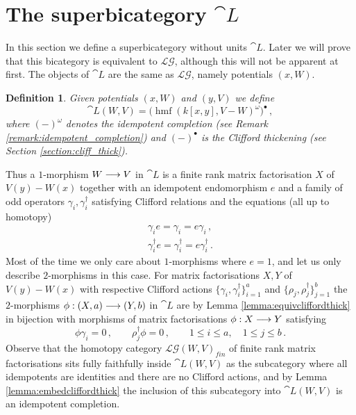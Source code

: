 \documentclass[english,letter paper,12pt,leqno]{article}
\theoremstyle{example}
\newtheorem{definition}[theorem]{Definition}
\numberwithin{equation}{section}
\def\LG{\mathcal{LG}}
\def\be{\begin{equation}}
\def\ee{\end{equation}}
\DeclareMathOperator{\hmf}{hmf}
\begin{document}
\section{The superbicategory $\cat{L}$}\label{section:lg_cut_system}


In this section we define a superbicategory without units $\cat{L}$. Later we will prove that this bicategory is equivalent to $\LG$, although this will not be apparent at first. The objects of $\cat{L}$ are the same as $\LG$, namely potentials $(x,W)$.

\begin{definition} Given potentials $(x,W)$ and $(y,V)$ we define
\be\label{eq:defnluv}
\cat{L}(W,V) = \Big( \hmf( k[x,y], V - W )^{\omega} \Big)^{\bullet}\,,
\ee
where $(-)^\omega$ denotes the idempotent completion (see Remark \ref{remark:idempotent_completion}) and $(-)^{\bullet}$ is the Clifford thickening (see Section \ref{section:cliff_thick}).
\end{definition}

Thus a $1$-morphism $W \longrightarrow V$ in $\cat{L}$ is a finite rank matrix factorisation $X$ of $V(y) - W(x)$ together with an idempotent endomorphism $e$ and a family of odd operators $\gamma_i, \gamma_i^\dagger$ satisfying Clifford relations and the equations (all up to homotopy)
\begin{gather*}
\gamma_i e = \gamma_i = e \gamma_i\,, \\
\gamma_i^\dagger e = \gamma_i^\dagger = e \gamma_i^\dagger\,.
\end{gather*}
Most of the time we only care about $1$-morphisms where $e = 1$, and let us only describe $2$-morphisms in this case. For matrix factorisations $X,Y$ of $V(y) - W(x)$ with respective Clifford actions $\{ \gamma_i, \gamma_i^\dagger \}_{i=1}^a$ and $\{ \rho_j, \rho_j^\dagger \}_{j=1}^b$ the $2$-morphisms $\phi: (X,a) \longrightarrow (Y,b)$ in $\cat{L}$ are by Lemma \ref{lemma:equivcliffordthick} in bijection with morphisms of matrix factorisations $\phi: X \longrightarrow Y$ satisfying
\[
\phi \gamma_i = 0\,, \qquad \rho_j^\dagger \phi = 0\,, \qquad 1 \le i \le a, \quad 1 \le j \le b\,.
\]
Observe that the homotopy category $\LG(W,V)_{fin}$ of finite rank matrix factorisations sits fully faithfully inside $\cat{L}(W,V)$ as the subcategory where all idempotents are identities and there are no Clifford actions, and by Lemma \ref{lemma:embedcliffordthick} the inclusion of this subcategory into $\cat{L}(W,V)$ is an idempotent completion.
\end{document}
